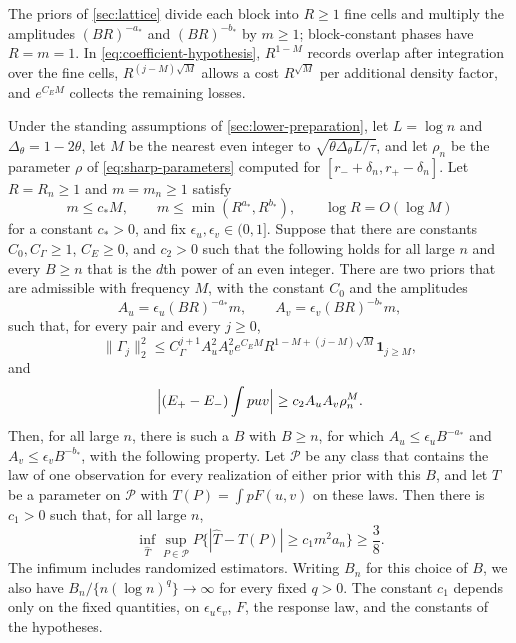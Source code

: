 The priors of \cref{sec:lattice} divide each block into $R\ge1$
fine cells and multiply the amplitudes $(BR)^{-a_*}$ and $(BR)^{-b_*}$
by $m\ge1$; block-constant phases have $R=m=1$.
In \eqref{eq:coefficient-hypothesis}, $R^{1-M}$ records overlap after
integration over the fine cells, $R^{(j-M)\sqrt M}$ allows a cost
$R^{\sqrt M}$ per additional density factor, and $e^{C_EM}$ collects
the remaining losses.

\begin{proposition}\label{prop:reduction}
Under the standing assumptions of \cref{sec:lower-preparation},
let $L=\log n$ and $\Delta_\theta=1-2\theta$, let $M$ be the nearest
even integer to $\sqrt{\theta\Delta_\theta L/\tau}$, and let $\rho_n$
be the parameter $\rho$ of \eqref{eq:sharp-parameters} computed for
$[r_-+\delta_n,r_+-\delta_n]$. Let $R=R_n\ge1$ and $m=m_n\ge1$ satisfy
\[
 m\le c_*M,\qquad m\le\min(R^{a_*},R^{b_*}),\qquad
 \log R=O(\log M)
\]
for a constant $c_*>0$, and fix $\epsilon_u,\epsilon_v\in(0,1]$.
Suppose that there are constants $C_0,C_\Gamma\ge1$, $C_E\ge0$, and
$c_2>0$ such that the following holds for all large $n$ and every
$B\ge n$ that is the $d$th power of an even integer. There are two
priors that are admissible with frequency $M$, with the constant $C_0$
and the amplitudes
\[
 A_u=\epsilon_u(BR)^{-a_*}m,\qquad A_v=\epsilon_v(BR)^{-b_*}m,
\]
such that, for every pair and every $j\ge0$,
\begin{equation}\label{eq:coefficient-hypothesis}
 \|\Gamma_j\|_2^2\le C_\Gamma^{j+1}A_u^2A_v^2e^{C_EM}
 R^{1-M+(j-M)\sqrt M}\mathbf 1_{j\ge M},
\end{equation}
and
\begin{equation}\label{eq:separation-hypothesis}
 \Bigl|(E_+-E_-)\int puv\Bigr|\ge c_2A_uA_v\rho_n^M.
\end{equation}
Then, for all large $n$, there is such a $B$ with $B\ge n$, for which
$A_u\le\epsilon_uB^{-a_*}$ and $A_v\le\epsilon_vB^{-b_*}$, with the
following property. Let $\mathcal P$ be any class that contains the
law of one observation for every realization of either prior with
this $B$, and let $T$ be a parameter on $\mathcal P$ with
$T(P)=\int pF(u,v)$ on these laws. Then there is $c_1>0$ such that, for
all large $n$,
\begin{equation}\label{eq:lower-testing-transfer}
 \inf_{\widehat T}\sup_{P\in\mathcal P}
 P\{|\widehat T-T(P)|\ge c_1m^2a_n\}\ge\frac38 .
\end{equation}
The infimum includes randomized estimators. Writing $B_n$ for this
choice of $B$, we also have $B_n/\{n(\log n)^q\}\to\infty$ for every
fixed $q>0$. The constant $c_1$ depends only on the fixed quantities,
on $\epsilon_u\epsilon_v$, $F$, the response law, and the constants of
the hypotheses.
\end{proposition}

